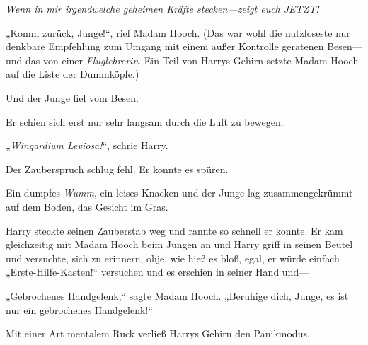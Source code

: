 \emph{Wenn in mir irgendwelche geheimen Kräfte stecken—zeigt euch JETZT!}

„Komm zurück, Junge!“, rief Madam Hooch. (Das war wohl die nutzloseste nur denkbare Empfehlung zum Umgang mit einem außer Kontrolle geratenen Besen—und das von einer \emph{Fluglehrerin}. Ein Teil von Harrys Gehirn setzte Madam Hooch auf die Liste der Dummköpfe.)

Und der Junge fiel vom Besen.

Er schien sich erst nur sehr langsam durch die Luft zu bewegen.

„\emph{Wingardium Leviosa!}“, schrie Harry.

Der Zauberspruch schlug fehl. Er konnte es spüren.

Ein dumpfes \emph{Wumm}, ein leises Knacken und der Junge lag zusammengekrümmt auf dem Boden, das Gesicht im Gras.

Harry steckte seinen Zauberstab weg und rannte so schnell er konnte. Er kam gleichzeitig mit Madam Hooch beim Jungen an und Harry griff in seinen Beutel und versuchte, sich zu erinnern, ohje, wie hieß es bloß, egal, er würde einfach „Erste-Hilfe-Kasten!“ versuchen und es erschien in seiner Hand und—

„Gebrochenes Handgelenk,“ sagte Madam Hooch. „Beruhige dich, Junge, es ist nur ein gebrochenes Handgelenk!“

Mit einer Art mentalem Ruck verließ Harrys Gehirn den Panikmodus.

